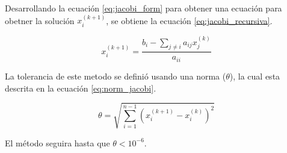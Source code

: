 Desarrollando la ecuación \ref{eq:jacobi_form} para obtener una ecuación para obetner la solución $x_i^{(k+1)}$, se obtiene la ecuación \ref{eq:jacobi_recursiva}.

\begin{equation}
    x_i^{(k+1)} = \frac{b_i - \sum\limits_{j\neq i} a_{ij}x_{j}^{(k)}}{a_{ii}} \label{eq:jacobi_recursiva}
\end{equation}

La tolerancia de este metodo se definió usando una norma ($\theta$), la cual esta descrita en la ecuación \ref{eq:norm_jacobi}.

\begin{equation}
    \theta =\sqrt{\sum_{i=1}^{n-1} (x_i^{(k+1)}-x_i^{(k)})^2} \label{eq:norm_jacobi}
\end{equation}

El método seguira hasta que $\theta < 10^{-6}$.